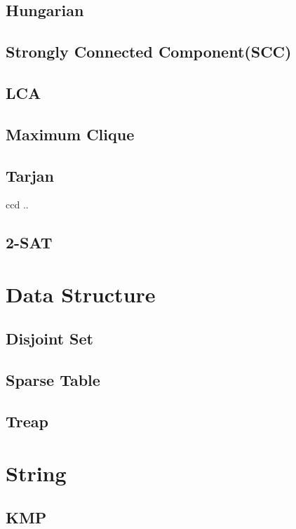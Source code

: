 \subsection{Hungarian}

\subsection{Strongly Connected Component(SCC)}

\subsection{LCA}

\subsection{Maximum Clique}

\subsection{Tarjan}ccd ..

\subsection{2-SAT}


\section{Data Structure}

\subsection{Disjoint Set}

\subsection{Sparse Table}

\subsection{Treap}


\section{String}

\subsection{KMP}

